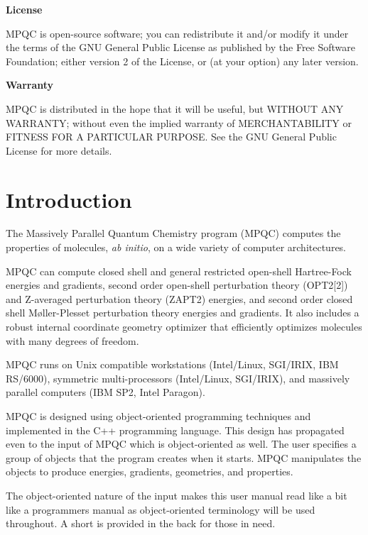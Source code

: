 \documentclass[notitlepage,letterpaper%
              ]{report}
\begin{document}
\begin{titlepage}
\begin{center}
\textbf{License}
\end{center}

MPQC is open-source software; you can redistribute it and/or modify it
under the terms of the GNU General Public License as published by the Free
Software Foundation; either version 2 of the License, or (at your option)
any later version.

\begin{center}
\textbf{Warranty}
\end{center}

MPQC is distributed in the hope that it will be useful, but WITHOUT ANY
WARRANTY; without even the implied warranty of MERCHANTABILITY or FITNESS
FOR A PARTICULAR PURPOSE.  See the GNU General Public License for more
details.

\end{titlepage}

\tableofcontents
\listoftables

\chapter{Introduction}
The Massively Parallel Quantum Chemistry program (MPQC) computes
the properties of molecules, {\it ab initio}, on a wide variety
of computer architectures.

MPQC can compute closed shell and general restricted open-shell
Hartree-Fock energies and gradients, second order open-shell
perturbation theory (OPT2[2]) and Z-averaged perturbation theory
(ZAPT2) energies, and second order closed shell M\o{}ller-Plesset
perturbation theory energies and gradients.  It also includes a
robust internal coordinate geometry optimizer that efficiently
optimizes molecules with many degrees of freedom.

MPQC runs on Unix compatible workstations (Intel/Linux, SGI/IRIX,
IBM RS/6000), symmetric multi-processors (Intel/Linux, SGI/IRIX),
and massively parallel computers (IBM SP2, Intel Paragon).

MPQC is designed using object-oriented programming techniques and
implemented in the C++ programming language.  This design has
propagated even to the input of MPQC which is object-oriented
as well.  The user specifies a group of objects that the program
creates when it starts.  MPQC manipulates the objects to produce
energies, gradients, geometries, and properties.

The object-oriented nature of the input makes this user manual read like a
bit like a programmers manual as object-oriented terminology will be used
throughout.  A short  is provided in the back
for those in need.
\end{document}
